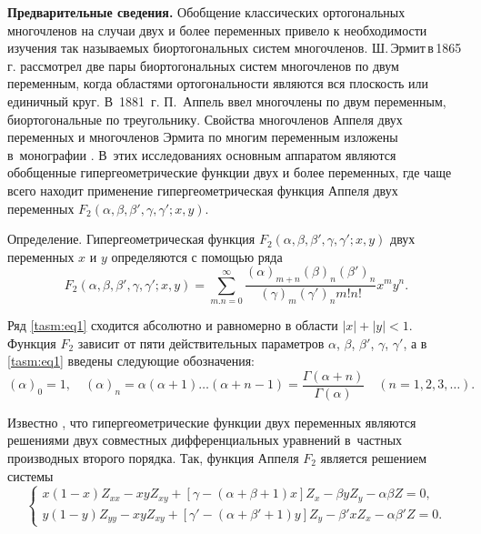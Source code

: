\date{11/I/2015}



\makerutitle





\textbf{Предварительные сведения.} 
Обобщение классических ортогональных многочленов на случаи двух и более переменных привело к необходимости изучения так называемых биортогональных систем многочленов. 
Ш.\,Эрмит\,в\,1865\,г. рассмотрел две пары биортогональных систем многочленов по двум переменным, когда
областями ортогональности являются вся плоскость или единичный круг. 
В~1881~г. П.~Аппель ввел многочлены по двум переменным, биортогональные по треугольнику. 
Свойства многочленов Аппеля двух переменных и многочленов Эрмита по многим переменным изложены в~монографии 
\cite{tasm:1}. 
В~этих исследованиях основным аппаратом являются обобщенные гипергеометрические функции двух и более переменных,
где чаще всего находит применение гипергеометрическая функция Аппеля двух переменных 
$F_{2}(\alpha, \beta, \beta', \gamma, \gamma'; x, y)$.


{\small \sc Определение.} Гипергеометрическая функция $F_{2}(\alpha, \beta, \beta', \gamma, \gamma'; x, y)$ двух переменных $x$ и $y$ определяются с помощью ряда
\begin{equation}
F_{2}(\alpha, \beta, \beta', \gamma, \gamma'; x,
y)=\sum_{m.n=0}^{\infty}\frac{(\alpha)_{m+n}    (\beta)_{n}
    (\beta')_{n}}{(\gamma)_{m}    (\gamma')_{n}    m!   
n!}     x^{m}    y^{n}.
\label{tasm:eq1}
\end{equation}

Ряд \eqref{tasm:eq1} сходится абсолютно и равномерно в области $|x|+|y|<1$. 
Функция $F_{2}$ зависит от пяти действительных параметров $\alpha$, $\beta$, $\beta'$, $\gamma$, $\gamma'$, а в \eqref{tasm:eq1} введены следующие обозначения:
$$
(\alpha)_{0}=1, \quad 
(\alpha)_{n}=\alpha(\alpha+1)\dots (\alpha+n-1)=\frac{\Gamma(\alpha+n)}{\Gamma(\alpha)}
\quad (n=1, 2, 3, \dots).
$$

Известно \cite{tasm:1}, что гипергеометрические функции двух переменных являются решениями двух совместных дифференциальных уравнений в~частных производных второго порядка. 
Так, функция Аппеля $F_{2}$
является решением системы
\begin{equation}
\left\{
\begin{array}{l}
x(1-x)    Z_{xx}-xy     Z_{xy}+[\gamma-(\alpha+\beta+1)x]   
Z_{x}-\beta    y     Z_{y}-\alpha\beta     Z=0,\\[0.2cm]
y(1-y)    Z_{yy}-xy     Z_{xy}+[\gamma'-(\alpha+\beta'+1)y]
    Z_{y}-\beta'    x     Z_{x}-\alpha\beta'     Z=0.
\end{array}
\right.
\label{tasm:eq2}
\end{equation}

